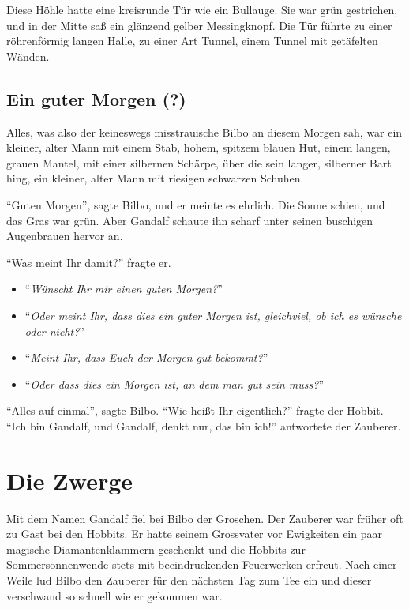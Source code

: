 \documentclass[12pt,a4paper,bibtotoc]{scrreprt}
\begin{document}
Diese Höhle hatte eine kreisrunde Tür wie ein Bullauge. Sie war grün
gestrichen, und in der Mitte saß ein glänzend gelber Messingknopf. Die
Tür führte zu einer röhrenförmig langen Halle, zu einer Art Tunnel,
einem Tunnel mit getäfelten Wänden.

\subsection*{Ein guter Morgen (?)}
Alles, was also der keineswegs misstrauische Bilbo an diesem Morgen sah,
war ein kleiner, alter Mann mit einem Stab, hohem, spitzem blauen Hut, 
einem langen, grauen Mantel, mit einer silbernen Schärpe,  
über die sein langer, silberner Bart hing, 
ein kleiner, alter Mann mit riesigen schwarzen Schuhen.

\enquote{Guten Morgen}, sagte Bilbo, und er meinte es ehrlich. 
Die Sonne schien, und das Gras war grün. 
Aber Gandalf schaute ihn scharf unter seinen buschigen Augenbrauen hervor an.

\enquote{Was meint Ihr damit?} fragte er. 
\begin{itemize}
  \item \enquote{\emph{Wünscht Ihr mir einen guten Morgen?}}

  \item \enquote{\emph{Oder meint Ihr, dass dies ein guter Morgen
        ist, gleichviel, ob ich es wünsche oder nicht?}}
  \item \enquote{\emph{Meint Ihr, dass Euch der Morgen gut bekommt?}}
  \item \enquote{\emph{Oder dass dies ein Morgen ist, an dem man gut
        sein muss?}}
\end{itemize}

\enquote{Alles auf einmal}, sagte Bilbo. \enquote{Wie heißt Ihr
  eigentlich?} fragte der Hobbit. \enquote{Ich bin Gandalf, und Gandalf,
denkt nur, das bin ich!} antwortete der Zauberer.
%
\section{Die Zwerge}
\label{sec:zwerge}
Mit dem Namen Gandalf fiel bei Bilbo der Groschen. Der Zauberer war
früher oft zu Gast bei den Hobbits. Er hatte seinem Grossvater vor
Ewigkeiten ein paar magische Diamantenklammern geschenkt und die
Hobbits zur Sommersonnenwende stets mit beeindruckenden Feuerwerken
erfreut. Nach einer Weile lud Bilbo den Zauberer für den nächsten Tag
zum Tee ein und dieser verschwand so schnell wie er gekommen war.
 
\end{document}
